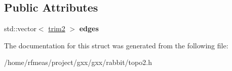 \subsection*{Public Attributes}
\begin{DoxyCompactItemize}
\item 
std\+::vector$<$ \hyperlink{structrabbit_1_1trim2}{trim2} $>$ {\bfseries edges}\hypertarget{structrabbit_1_1loop2_ae732bddab2bf6290eef2f211cd73e2ce}{}\label{structrabbit_1_1loop2_ae732bddab2bf6290eef2f211cd73e2ce}

\end{DoxyCompactItemize}


The documentation for this struct was generated from the following file\+:\begin{DoxyCompactItemize}
\item 
/home/rfmeas/project/gxx/gxx/rabbit/topo2.\+h\end{DoxyCompactItemize}
